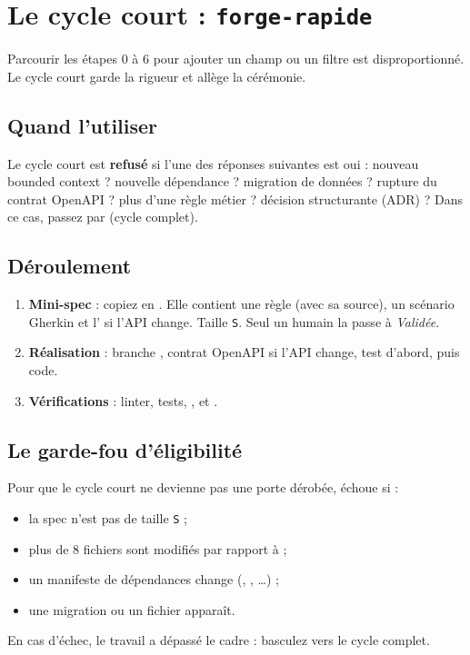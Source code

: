 \chapter{Le cycle court : \texttt{forge-rapide}}
Parcourir les étapes 0 à 6 pour ajouter un champ ou un filtre est disproportionné. Le cycle court garde la rigueur et allège la cérémonie.

\section{Quand l'utiliser}
Le cycle court est \textbf{refusé} si l'une des réponses suivantes est oui : nouveau bounded context ? nouvelle dépendance ? migration de données ? rupture du contrat OpenAPI ? plus d'une règle métier ? décision structurante (ADR) ? Dans ce cas, passez par  (cycle complet).

\section{Déroulement}
\begin{enumerate}
  \item \textbf{Mini-spec} : copiez  en . Elle contient une règle (avec sa source), un scénario Gherkin et l' si l'API change. Taille \texttt{S}. Seul un humain la passe à \emph{Validée}.
  \item \textbf{Réalisation} : branche , contrat OpenAPI si l'API change, test d'abord, puis code.
  \item \textbf{Vérifications} : linter, tests, , et .
\end{enumerate}

\section{Le garde-fou d'éligibilité}
Pour que le cycle court ne devienne pas une porte dérobée,  échoue si :
\begin{itemize}
  \item la spec n'est pas de taille \texttt{S} ;
  \item plus de 8 fichiers sont modifiés par rapport à  ;
  \item un manifeste de dépendances change (, , \dots) ;
  \item une migration ou un fichier  apparaît.
\end{itemize}
En cas d'échec, le travail a dépassé le cadre : basculez vers le cycle complet.

